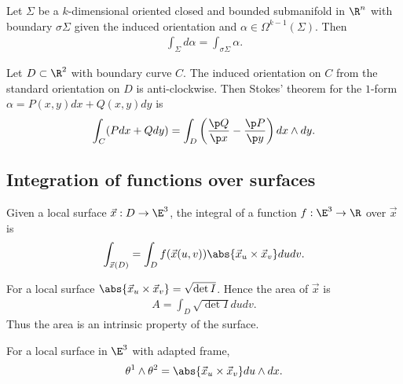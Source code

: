 \documentclass{article}
\begin{document}
\begin{theorem}[Stokes]
	Let $\Sigma$ be a $k$-dimensional oriented closed and bounded submanifold in $\R^n$ with
	boundary $\sigma\Sigma$ given the induced orientation and $\alpha\in\Omega^{k-1}(\Sigma)$.
	Then
	\begin{align*}
		\int_\Sigma d\alpha = \int_{\sigma\Sigma}\alpha.
	\end{align*}
\end{theorem}

\begin{corollary}[Green]
	Let $D\subset\R^2$ with boundary curve $C$. The induced orientation on $C$ from
	the standard orientation on $D$ is anti-clockwise. Then Stokes' theorem for the $1$-form
	$\alpha=P(x,y)dx + Q(x,y)dy$ is
	\begin{align*}
		\int_C(Pdx + Qdy) = \int_D\left(\frac{\p Q}{\p x}-\frac{\p P}{\p y}\right)dx\wedge dy.
	\end{align*}
\end{corollary}

\subsection{Integration of functions over surfaces}

\begin{definition}
	Given a local surface $\vec x:D\to\E^3$, the integral of a
	function $f:\E^3\to\R$ over $\vec x$ is
	\begin{align*}
		\int_{\vec x(D)} = \int_D f(\vec x(u,v))\abs{\vec x_u \times \vec x_v}dudv.
	\end{align*}
\end{definition}

\begin{lemma}[Notes 14.15]
	For a local surface $\abs{\vec x_u \times \vec x_v}=\sqrt{\det I}$. Hence the area
	of $\vec x$ is
	\begin{align*}
		A = \int_D \sqrt{\det I}dudv.
	\end{align*}
	Thus the area is an intrinsic property of the surface.
\end{lemma}

\begin{lemma}[Notes 14.16]
	For a local surface in $\E^3$ with adapted frame,
	\begin{align*}
		\theta^1\wedge\theta^2 = \abs{\vec x_u \times \vec x_v} du \wedge dx.
	\end{align*}
\end{lemma}
\end{document}
